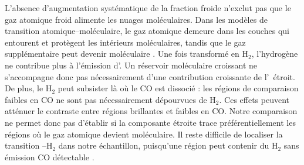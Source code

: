 L'absence d'augmentation systématique de la fraction froide n'exclut pas que le gaz atomique froid alimente les nuages moléculaires. Dans les modèles de transition atomique--moléculaire, le gaz atomique demeure dans les couches qui entourent et protègent les intérieurs moléculaires, tandis que le gaz supplémentaire peut devenir moléculaire \citep{Krumholz2009Transition,Sternberg2014}. Une fois transformé en H$_2$, l'hydrogène ne contribue plus à l'émission d'\HI. Un réservoir moléculaire croissant ne s'accompagne donc pas nécessairement d'une contribution croissante de l'\HI\ étroit. De plus, le H$_2$ peut subsister là où le CO est dissocié \citep{Wolfire2010} : les régions de comparaison faibles en CO ne sont pas nécessairement dépourvues de H$_2$. Ces effets peuvent atténuer le contraste entre régions brillantes et faibles en CO. Notre comparaison ne permet donc pas d'établir si la composante étroite trace préférentiellement les régions où le gaz atomique devient moléculaire. Il reste difficile de localiser la transition \HI--H$_2$ dans notre échantillon, puisqu'une région peut contenir du H$_2$ sans émission CO détectable \citep{Wolfire2010}.
